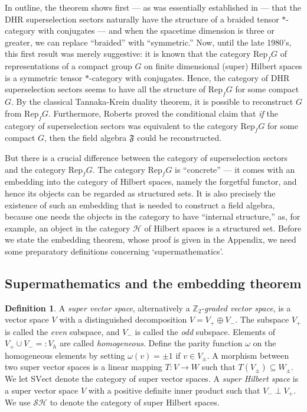 \documentclass[11pt]{article}
\newcommand{\alg}[1]{\mathfrak{#1}}
\theoremstyle{definition}
\theoremstyle{definition}
\newtheorem{defn}[thm]{Definition}
\theoremstyle{remark}
\newcommand{\SVect}{\mathrm{SVect}}
\def\2#1{{\mathcal #1}}
\def\7#1{{\mathbb #1}}
\def\om{\omega} \def\Om{\Omega} \def\dd{\partial} \def\D{\Delta}
\newcommand{\Rep}{\mathrm{Rep}}
\begin{document}
In outline, the theorem shows first --- as was
essentially established in \cite{dhr3} --- that the DHR
superselection sectors naturally have the structure of
a braided tensor $*$-category with conjugates --- and
when the spacetime dimension is three or greater, we
can replace ``braided'' with ``symmetric.''  Now, until
the late 1980's, this first result was merely
suggestive: it is known that the category $\Rep _f G$
of representations of a compact group $G$ on finite
dimensional (super) Hilbert spaces is a symmetric
tensor $*$-category with conjugates.  Hence, the
category of DHR superselection sectors seems to have
all the structure of $\Rep _fG$ for some compact $G$.
By the classical Tannaka-Krein duality theorem, it is
possible to reconstruct $G$ from $\Rep _fG$.
Furthermore, Roberts \cite{problem} proved the
conditional claim that \emph{if} the category of
superselection sectors was equivalent to the category
$\Rep _fG$ for some compact $G$, then the field algebra
$\alg{F}$ could be reconstructed.

But there is a crucial difference between the category of
superselection sectors and the category $\Rep _fG$.  The category
$\Rep _fG$ is ``concrete'' --- it comes with an embedding into the
category of Hilbert spaces, namely the forgetful functor, and hence
its objects can be regarded as structured sets.  It is also precisely
the existence of such an embedding that is needed to construct a field
algebra, because one needs the objects in the category to have
``internal structure,'' as, for example, an object in the category
$\2H$ of Hilbert spaces is a structured set.  Before we state the
embedding theorem, whose proof is given in the Appendix, we need some
preparatory definitions concerning `supermathematics'.

 

\subsection{Supermathematics and the embedding theorem}

\begin{defn} A \emph{super vector space}, alternatively
  a $\7Z_2$-\emph{graded vector space}, is a vector
  space $V$ with a distinguished decomposition
  $V=V_+\oplus V_-$.  The subspace $V_+$ is called the
  \emph{even} subspace, and $V_-$ is called the
  \emph{odd} subspace.  Elements of $V_+\cup V_-=:V_h$
  are called \emph{homogeneous}.  Define the parity
  function $\om$ on the homogeneous elements by setting
  $\om (v)=\pm 1$ if $v\in V_{\pm}$.  A morphism
  between two super vector spaces is a linear mapping
  $T:V\to W$ such that $T(V_\pm )\subseteq W_\pm $.  We
  let $\SVect$ denote the category of super vector
  spaces.  A \emph{super Hilbert space} is a super
  vector space $V$ with a positive definite inner
  product such that $V_-\perp V_+$.  We use $\2S\2H$ to
  denote the category of super Hilbert spaces.
\end{defn}
\end{document}
